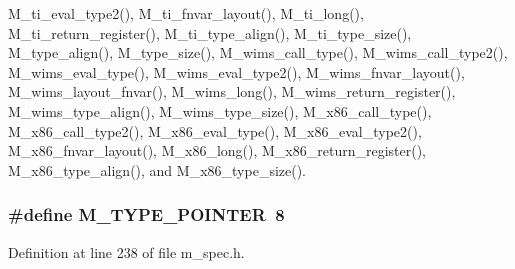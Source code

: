 M\_\-ti\_\-eval\_\-type2(), M\_\-ti\_\-fnvar\_\-layout(), M\_\-ti\_\-long(), M\_\-ti\_\-return\_\-register(), M\_\-ti\_\-type\_\-align(), M\_\-ti\_\-type\_\-size(), M\_\-type\_\-align(), M\_\-type\_\-size(), M\_\-wims\_\-call\_\-type(), M\_\-wims\_\-call\_\-type2(), M\_\-wims\_\-eval\_\-type(), M\_\-wims\_\-eval\_\-type2(), M\_\-wims\_\-fnvar\_\-layout(), M\_\-wims\_\-layout\_\-fnvar(), M\_\-wims\_\-long(), M\_\-wims\_\-return\_\-register(), M\_\-wims\_\-type\_\-align(), M\_\-wims\_\-type\_\-size(), M\_\-x86\_\-call\_\-type(), M\_\-x86\_\-call\_\-type2(), M\_\-x86\_\-eval\_\-type(), M\_\-x86\_\-eval\_\-type2(), M\_\-x86\_\-fnvar\_\-layout(), M\_\-x86\_\-long(), M\_\-x86\_\-return\_\-register(), M\_\-x86\_\-type\_\-align(), and M\_\-x86\_\-type\_\-size().
\subsubsection{\setlength{\rightskip}{0pt plus 5cm}\#define M\_\-TYPE\_\-POINTER~8}\label{m__spec_8h_47fc97898429c550c47ab38e9f878c94}




Definition at line 238 of file m\_\-spec.h.

